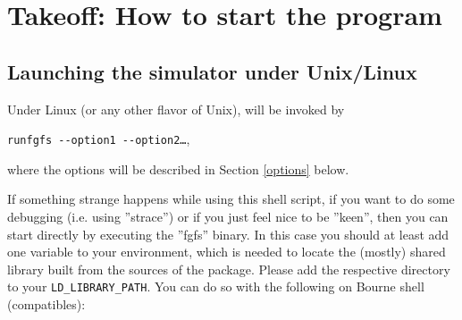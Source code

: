 
\chapter{Takeoff: How to start the program\label{takeoff}}
\section{Launching the simulator under Unix/Linux}
Under Linux (or any other flavor of Unix), \FlightGear{} will be invoked by
 \medskip

  \texttt{runfgfs -$ $-option1 -$ $-option2\dots},
 \medskip

\noindent
 where the options will be described in Section \ref{options} below.
 
If something strange happens while using this shell script, if you want to do some
debugging (i.e. using ''strace'') or if you just feel nice to be ''keen'', then you can
start \FlightGear{} directly by executing the ''fgfs'' binary. In this case you should at
least add one variable to your environment, which is needed
to locate the (mostly) shared library built from the sources of the \SimGear{}
package. Please add the respective directory to your \verb/LD_LIBRARY_PATH/. You can do
so with the following on Bourne shell (compatibles):

